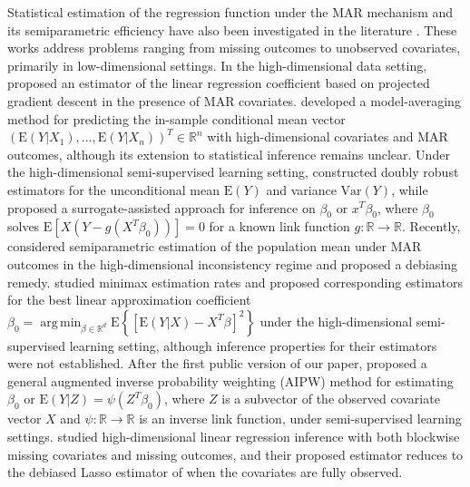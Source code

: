 \documentclass[ejsv2,noshowframe]{imsart}
\theoremstyle{plain}
\theoremstyle{definition}
\theoremstyle{remark}
\DeclareMathOperator*{\argmin}{arg\,min}
\begin{document}
Statistical estimation of the regression function under the MAR mechanism and its semiparametric efficiency have also been investigated in the literature \citep{robins1994estimation,robins1995semiparametric,robins1995analysis,graham2011efficiency,muller2012efficient}. These works address problems ranging from missing outcomes to unobserved covariates, primarily in low-dimensional settings. In the high-dimensional data setting, \cite{loh2012high} proposed an estimator of the linear regression coefficient based on projected gradient descent in the presence of MAR covariates. \cite{xie2021model} developed a model-averaging method for predicting the in-sample conditional mean vector $\left(\mathrm{E}(Y|X_1),...,\mathrm{E}(Y|X_n)\right)^T\in \mathbb{R}^n$ with high-dimensional covariates and MAR outcomes, although its extension to statistical inference remains unclear. Under the high-dimensional semi-supervised learning setting, \cite{zhang2022high} constructed doubly robust estimators for the unconditional mean $\mathrm{E}(Y)$ and variance $\mathrm{Var}(Y)$, while \cite{hou2023surrogate} proposed a surrogate-assisted approach for inference on $\beta_0$ or $x^T\beta_0$, where $\beta_0$ solves $\mathrm{E}\left[X(Y-g(X^T\beta_0))\right]=0$ for a known link function $g:\mathbb{R}\to \mathbb{R}$.
Recently, \cite{celentano2023challenges} considered semiparametric estimation of the population mean under MAR outcomes in the high-dimensional inconsistency regime and proposed a debiasing remedy. \cite{deng2024optimal} studied minimax estimation rates and proposed corresponding estimators for the best linear approximation coefficient $\beta_0=\argmin_{\beta \in \mathbb{R}^d} \mathrm{E}\left\{\left[\mathrm{E}(Y|X) -X^T\beta\right]^2\right\}$ under the high-dimensional semi-supervised learning setting, although inference properties for their estimators were not established. After the first public version of our paper, \cite{tian2024semi} proposed a general augmented inverse probability weighting (AIPW) method for estimating $\beta_0$ or $\mathrm{E}(Y|Z)=\psi(Z^T\beta_0)$, where $Z$ is a subvector of the observed covariate vector $X$ and $\psi:\mathbb{R}\to \mathbb{R}$ is an inverse link function, under semi-supervised learning settings. \cite{song2024semi} studied high-dimensional linear regression inference with both blockwise missing covariates and missing outcomes, and their proposed estimator reduces to the debiased Lasso estimator of \cite{van2014asymptotically} when the covariates are fully observed. 
\end{document}
